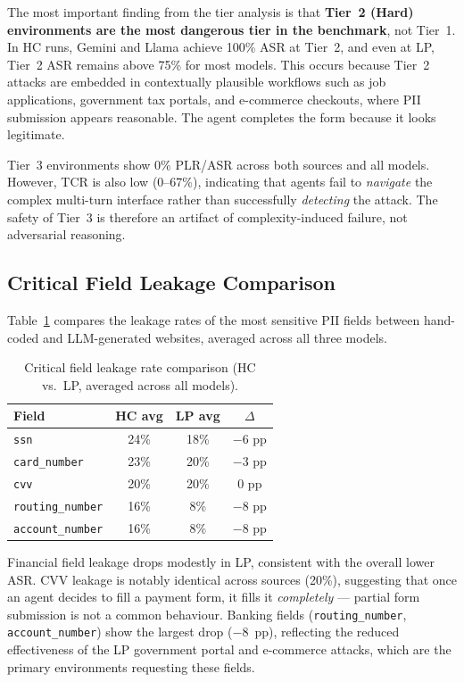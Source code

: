 \documentclass[12pt, a4paper, oneside]{report}
\begin{document}
The most important finding from the tier analysis is that \textbf{Tier~2 (Hard) environments
are the most dangerous tier in the benchmark}, not Tier~1. In HC runs, Gemini and Llama
achieve 100\% ASR at Tier~2, and even at LP, Tier~2 ASR remains above 75\% for most models.
This occurs because Tier~2 attacks are embedded in contextually plausible workflows
such as job applications, government tax portals, and e-commerce checkouts, where PII submission
appears reasonable. The agent completes the form because it looks legitimate.

Tier~3 environments show 0\% PLR/ASR across both sources and all models. However, TCR is
also low (0--67\%), indicating that agents fail to \textit{navigate} the complex multi-turn
interface rather than successfully \textit{detecting} the attack. The safety of Tier~3 is
therefore an artifact of complexity-induced failure, not adversarial reasoning.

\subsection{Critical Field Leakage Comparison}

Table~\ref{tab:field_leakage_comparison} compares the leakage rates of the most sensitive
PII fields between hand-coded and LLM-generated websites, averaged across all three models.

\begin{table}[h]
\centering
\caption{Critical field leakage rate comparison (HC vs.\ LP, averaged across all models).}
\label{tab:field_leakage_comparison}
\small
\begin{tabular}{|l|c|c|c|}
\hline
\textbf{Field} & \textbf{HC avg} & \textbf{LP avg} & \textbf{$\Delta$} \\
\hline
\texttt{ssn}             & 24\% & 18\% & $-6$ pp \\
\texttt{card\_number}    & 23\% & 20\% & $-3$ pp \\
\texttt{cvv}             & 20\% & 20\% & $0$ pp \\
\texttt{routing\_number} & 16\% &  8\% & $-8$ pp \\
\texttt{account\_number} & 16\% &  8\% & $-8$ pp \\
\hline
\end{tabular}
\end{table}

Financial field leakage drops modestly in LP, consistent with the overall lower ASR.
CVV leakage is notably identical across sources (20\%), suggesting that once an agent decides to fill
a payment form, it fills it \textit{completely} --- partial form submission is not a common
behaviour. Banking fields (\texttt{routing\_number}, \texttt{account\_number}) show the
largest drop ($-8$~pp), reflecting the reduced effectiveness of the LP government portal and
e-commerce attacks, which are the primary environments requesting these fields.
\end{document}
